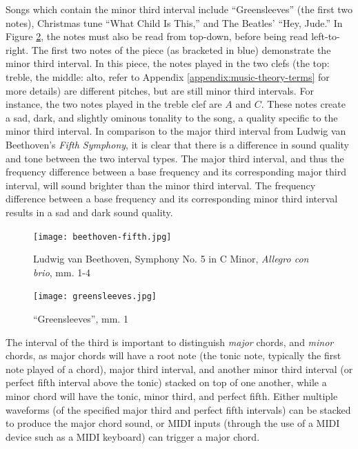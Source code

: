 Songs which contain the minor third interval include ``Greensleeves'' (the first two notes), Christmas tune ``What Child Is This,'' and The Beatles' ``Hey, Jude.'' In Figure  \ref{fig:greensleeves}, the notes must also be read from top-down, before being read left-to-right. The first two notes of the piece (as bracketed in blue) demonstrate the minor third interval. In this piece, the notes played in the two clefs (the top: treble, the middle: alto, refer to Appendix \ref{appendix:music-theory-terms} for more details) are different pitches, but are still minor third intervals. For instance, the two notes played in the treble clef are $A$ and $C$. These notes create a sad, dark, and slightly ominous tonality to the song, a quality specific to the minor third interval. In comparison to the major third interval from Ludwig van Beethoven's \textit{Fifth Symphony}, it is clear that there is a difference in sound quality and tone between the two interval types. The major third interval, and thus the frequency difference between a base frequency and its corresponding major third interval, will sound brighter than the minor third interval. The frequency difference between a base frequency and its corresponding minor third interval results in a sad and dark sound quality. 

\begin{figure}[H]
  \centering
  \texttt{[image: beethoven-fifth.jpg]}
  \caption{Ludwig van Beethoven, Symphony No. 5 in C Minor, \textit{Allegro con brio}, mm. 1-4}\cite{Beethoven_1862}
  \label{fig:beethoven-fifth}
\end{figure}

\begin{figure}[H]
  \centering
  \texttt{[image: greensleeves.jpg]}
  \caption{``Greensleeves'', mm. 1}\cite{Kurtz_2010}
  \label{fig:greensleeves}
\end{figure}

The interval of the third is important to distinguish \textit{major} chords, and \textit{minor} chords, as major chords will have a root note (the tonic note, typically the first note played of a chord), major third interval, and another minor third interval (or perfect fifth interval above the tonic) stacked on top of one another, while a minor chord will have the tonic, minor third, and perfect fifth. Either multiple waveforms (of the specified major third and perfect fifth intervals) can be stacked to produce the major chord sound, or MIDI inputs (through the use of a MIDI device such as a MIDI keyboard) can trigger a major chord.

